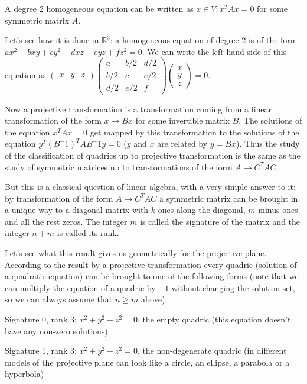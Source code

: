 {{A degree 2 homogeneous equation can be written as $x\in V: x^T A x=0$ for some symmetric matrix $A$.

Let's see how it is done in $\mathbb{R}^3$: a homogeneous equation of degree 2 is of the form $a x^2 + b x y + c y^2 + d x z + e y z + f z^2=0$. We can write the left-hand side of this equation as $\left(\begin{matrix}x & y & z \end{matrix}\right)\left(\begin{matrix}a & b/2 & d/2 \\ b/2 & c & e/2 \\ d/2 & e/2 & f \end{matrix}\right)\left(\begin{matrix}x \\ y \\ z \end{matrix}\right)=0$.

Now a projective transformation is a transformation coming from a linear transformation of the form $x\to Bx$ for some invertible matrix $B$. The solutions of the equation $x^T A x=0$ get mapped by this transformation to the solutions of the equation $y^T (B^-1)^TAB^-1 y=0$ ($y$ and $x$ are related by $y=Bx$). Thus the study of the classification of quadrics up to projective transformation is the same as the study of symmetric matrices up to transformations of the form $A\to C^T A C$.

But this is a classical question of linear algebra, with a very simple answer to it: by transformation of the form $A \to C^T A C$ a symmetric matrix can be brought in a unique way to a diagonal matrix with $k$ ones along the diagonal, $m$ minus ones and all the rest zeros. The integer $m$ is called the signature of the matrix and the integer $n+m$ is called its rank.

Let's see what this result gives us geometrically for the projective plane. According to the result by a projective transformation every quadric (solution of a quadratic equation) can be brought to one of the following forms (note that we can multiply the equation of a quadric by $-1$ without changing the solution set, so we can always assume that $n\ge m$ above):

Signature 0, rank 3: $x^2+y^2+z^2=0$, the empty quadric (this equation doesn't have any non-zero solutions)

Signature 1, rank 3: $x^2+y^2-z^2=0$, the non-degenerate quadric (in different models of the projective plane can look like a circle, an ellipse, a parabola or a hyperbola)

}}
